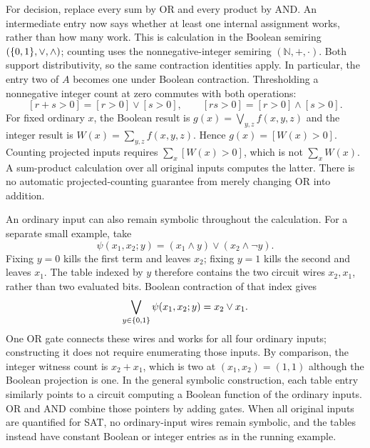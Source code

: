 For decision, replace every sum by OR and every product by AND. An
intermediate entry now says whether at least one internal assignment works,
rather than how many work. This is calculation in the Boolean semiring
$(\{0,1\},\lor,\land)$; counting uses the nonnegative-integer semiring
$(\mathbb{N},+,\cdot)$. Both support distributivity, so the same contraction
identities apply. In particular, the entry two of $A$ becomes one under
Boolean contraction. Thresholding a nonnegative integer count at zero
commutes with both operations:
\[
 [r+s>0]=[r>0]\lor[s>0],\qquad
 [rs>0]=[r>0]\land[s>0].
\]
For fixed ordinary $x$, the Boolean result is
$g(x)=\bigvee_{y,z}f(x,y,z)$ and the integer result is
$W(x)=\sum_{y,z}f(x,y,z)$. Hence $g(x)=[W(x)>0]$.
Counting projected inputs requires $\sum_x[W(x)>0]$, which is not
$\sum_x W(x)$. A sum-product calculation over all original inputs computes
the latter. There is no automatic projected-counting guarantee from merely
changing OR into addition.

An ordinary input can also remain symbolic throughout the calculation.
For a separate small example, take
\[
 \psi(x_1,x_2;y)=(x_1\land y)\lor(x_2\land\neg y).
\]
Fixing $y=0$ kills the first term and leaves $x_2$; fixing $y=1$
kills the second and leaves $x_1$. The table indexed by $y$ therefore
contains the two circuit wires $x_2,x_1$, rather than two evaluated bits.
Boolean contraction of that index gives
\begin{equation}\label{eq:walk-symbolic}
 \bigvee_{y\in\{0,1\}}\psi(x_1,x_2;y)=x_2\lor x_1.
\end{equation}
One OR gate connects these wires and works for all four ordinary inputs;
constructing it does not require enumerating those inputs. By comparison,
the integer witness count is $x_2+x_1$, which is two at $(x_1,x_2)=(1,1)$
although the Boolean projection is one. In the general symbolic construction,
each table entry similarly points to a circuit computing a Boolean function
of the ordinary inputs. OR and AND combine those pointers by adding gates.
When all original inputs are quantified for SAT, no ordinary-input wires
remain symbolic, and the tables instead have constant Boolean or integer
entries as in the running example.

